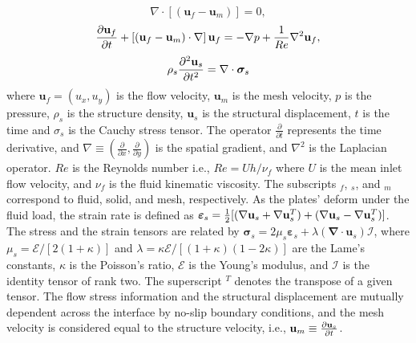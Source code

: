 \documentclass[%
aip,
amsmath,amssymb,
reprint,
]{revtex4-1}
\begin{document}
	\begin{equation}
		\nabla\cdot\left[(\mathbf{u}_f-\mathbf{u}_m)\right] = 0,
	\end{equation}\vspace{-0.65cm}
	\begin{equation}
		{\partial\mathbf{u}_f\over\partial t} + \left[(\mathbf{u}_f-\mathbf{u}_m) \cdot\mathbf{\nabla}\right]\mathbf{u}_f = -\nabla p+\frac{1}{Re}\nabla^2\mathbf{u}_f,
	\end{equation}\vspace{-0.65cm}
	\begin{equation}
		\rho_s{\partial^2\mathbf{u}_s\over\partial t^2} = \mathbf{\nabla}\cdot\mathbf{\boldsymbol{\sigma}}_s
	\end{equation}
	where $\mathbf{u}_f=(u_x,u_y)$ is the flow velocity, $\mathbf{u}_m$ is the mesh velocity, $p$ is the pressure, $\rho_s$ is the structure density, $\mathbf{u}_s$ is the structural displacement, $t$ is the time and $\sigma_s$ is the Cauchy stress tensor. The operator $\frac{\partial}{\partial t}$ represents the time derivative, and $\nabla\equiv\left(\frac{\partial}{\partial x},\frac{\partial}{\partial y}\right)$ is the spatial gradient, and $\nabla^2$ is the Laplacian operator. $Re$ is the Reynolds number i.e., $Re=Uh/\nu_f$ where $U$ is the mean inlet flow velocity, and $\nu_f$ is the fluid kinematic viscosity. The subscripts $_f$, $_s$, and $_m$ correspond to fluid, solid, and mesh, respectively. As the plates' deform under the fluid load, the strain rate is defined as $\boldsymbol{\varepsilon}_s={1\over2}[(\mathbf{\nabla}\mathbf{u}_s+\mathbf{\nabla}\mathbf{u}_s^T)+(\mathbf{\nabla}\mathbf{u}_s - \mathbf{\nabla}\mathbf{u}_s^T)]$. The stress and the strain tensors are related by $\boldsymbol{\sigma}_s=2\mu_s \boldsymbol{\varepsilon}_s+\lambda( \mathbf{\nabla}\cdot\mathbf{u}_s)\mathcal{I}$, where $\mu_s=\mathcal{E}/[2(1+\kappa)]$ and $\lambda=\kappa \mathcal{E}/[(1+\kappa)(1-2\kappa)]$ are the Lame's constants, $\kappa$ is the Poisson's ratio, $\mathcal{E}$ is the Young's modulus, and $\mathcal{I}$ is the identity tensor of rank two. The superscript $^T$ denotes the transpose of a given tensor. The flow stress information and the structural displacement are mutually dependent across the interface by no-slip boundary conditions, and the mesh velocity is considered equal to the structure velocity, i.e., $\mathbf{u}_m\equiv {\partial\mathbf{u}_s\over\partial t}$.
	
\end{document}
